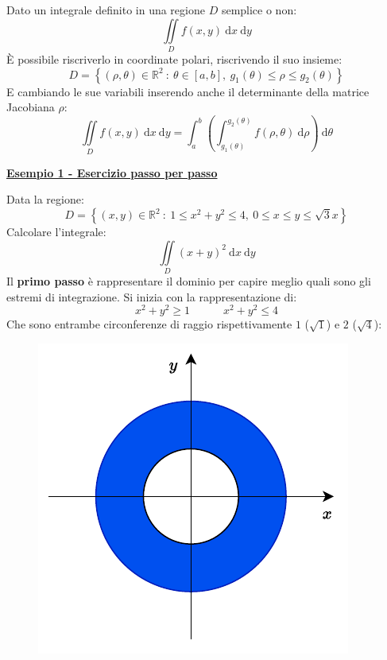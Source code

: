\documentclass[a4paper]{article}
\newcommand{\example}[1]{\textcolor{Green4}{\textbf{#1}}}
\begin{document}
	\begin{boxdef}
		Dato un integrale definito in una regione $D$ semplice o non:
		\begin{equation*}
			\displaystyle\iint\limits_{D} f\left(x,y\right) \:\mathrm{d}x\:\mathrm{d}y
		\end{equation*}
		È possibile riscriverlo in coordinate polari, riscrivendo il suo insieme:
		\begin{equation}
			D = \left\{\left(\rho,\theta\right) \in \mathbb{R}^{2} \: : \: \theta \in \left[a,b\right], \: g_{1}\left(\theta\right) \le \rho \le g_{2}\left(\theta\right) \right\}
		\end{equation}
		E cambiando le sue variabili inserendo anche il determinante della matrice Jacobiana $\rho$:
		\begin{equation}\label{eq: coordinate polari per gli integrali doppi}
			\displaystyle\iint\limits_{D} f\left(x,y\right) \:\mathrm{d}x\:\mathrm{d}y 
			= 
			\int_{a}^{b} \left(\int_{g_{1}\left(\theta\right)}^{g_{2}\left(\theta\right)} f\left(\rho, \theta\right) \:\mathrm{d}\rho\right)\:\mathrm{d}\theta
		\end{equation}
	\end{boxdef}\newpage

	\begin{flushleft}
		\example{\underline{Esempio 1 - Esercizio passo per passo}}
	\end{flushleft}
	Data la regione:
	\begin{equation*}
		D = \left\{\left(x,y\right) \in \mathbb{R}^{2} \: : \: 1 \le x^{2}+y^{2} \le 4, \: 0 \le x \le y \le \sqrt{3}x\right\}
	\end{equation*}
	Calcolare l'integrale:
	\begin{equation*}
		\displaystyle\iint\limits_{D} \left(x+y\right)^{2} \:\mathrm{d}x\:\mathrm{d}y
	\end{equation*}
	Il \textbf{primo passo} è rappresentare il dominio per capire meglio quali sono gli estremi di integrazione. Si inizia con la rappresentazione di:
	\begin{equation*}
		x^{2} + y^{2} \ge 1 \hspace{3em} x^{2} + y^{2} \le 4
	\end{equation*}
	Che sono entrambe circonferenze di raggio rispettivamente $1$ ($\sqrt{1}$) e $2$ ($\sqrt{4}$):
	\begin{figure}[!htp]
		\centering
		\includegraphics[width=.5\textwidth]{img/integrali_doppi-coordinate_polari-1.pdf}
	\end{figure}
\end{document}
